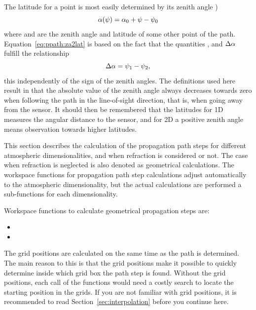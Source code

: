 The latitude for a point is most easily determined by its zenith angle
)
\begin{equation}
  \alpha(\psi) = \alpha_{0} + \psi - \psi_{0} 
  \label{eq:ppath:za2lat}
\end{equation}
where  and  are the zenith angle and latitude of some 
other point of the path. Equation~\ref{eq:ppath:za2lat} is based on the 
fact that the quantities ,  and $\Delta\alpha$
fulfill the relationship
\begin{equation}
  \Delta\alpha = \psi_{1} - \psi_{2},
\end{equation}
this independently of the sign of the zenith angles. The definitions
used here result in that the absolute value of the zenith angle always
decreases towards zero when following the path in the line-of-sight
direction, that is, when going away from the sensor. It should then be
remembered that the latitudes for 1D measures the angular distance to
the sensor, and for 2D a positive zenith angle means observation
towards higher latitudes.




\label{sec:ppath:stepcalc}

This section describes the calculation of the propagation path steps
for different atmospheric dimensionalities, and when refraction is
considered or not. The case when refraction is neglected is also
denoted as geometrical calculations. The workspace functions for
propagation path step calculations adjust automatically to the
atmospheric dimensionality, but the actual calculations are performed
a sub-functions for each dimensionality.

Workspace functions to calculate geometrical propagation steps are:
\begin{itemize}
\item {}
\item {}
\end{itemize}



The grid positions are calculated on the same time as the path is
determined. The main reason to this is that the grid positions make it
possible to quickly determine inside which grid box the path step is
found. Without the grid positions, each call of the functions would
need a costly search to locate the starting position in the grids.  If
you are not familiar with grid positions, it is recommended to read
Section~\ref{sec:interpolation} before you continue here.


